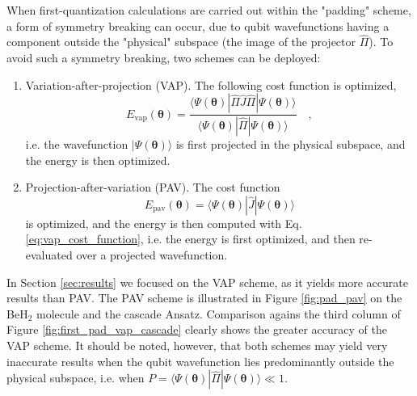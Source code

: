 \documentclass[aps,pra,onecolumn]{revtex4-2}
\newcommand{\bgreek}[1]{{\boldsymbol{#1}}}
\begin{document}
When first-quantization calculations are carried out within the "padding" scheme, a form of symmetry breaking can occur, 
due to qubit wavefunctions having a component outside the "physical" subspace (the image of the projector $\hat \Pi$).
To avoid such a symmetry breaking, two schemes can be deployed:
\begin{enumerate}
\item Variation-after-projection (VAP). The following cost function is optimized,
\begin{equation}
\label{eq:vap_cost_function}
E_{\mathrm{vap}}(\bgreek{\theta}) = \frac{ \langle \Psi(\bgreek{\theta}) | \hat \Pi \hat{J} \hat \Pi | \Psi(\bgreek{\theta}) \rangle }{ \langle \Psi(\bgreek{\theta}) | \hat\Pi | \Psi(\bgreek{\theta}) \rangle } \quad ,
\end{equation}
i.e. the wavefunction $| \Psi(\bgreek{\theta}) \rangle$ is first projected in the physical subspace, and the energy is then optimized.
\item Projection-after-variation (PAV). The cost function
\begin{equation}
E_{\mathrm{pav}}(\bgreek{\theta}) = \langle \Psi(\bgreek{\theta}) | \hat{J} | \Psi(\bgreek{\theta}) \rangle
\end{equation}
is optimized, and the energy is then computed with Eq. \eqref{eq:vap_cost_function},
i.e. the energy is first optimized, and then re-evaluated over a projected wavefunction.
\end{enumerate}
In Section \ref{sec:results} we focused on the VAP scheme, as it yields more accurate results than PAV.
The PAV scheme is illustrated in Figure \ref{fig:pad_pav} on the BeH$_2$ molecule and the cascade Ansatz. 
Comparison agains the third column of Figure \ref{fig:first_pad_vap_cascade} clearly shows the greater accuracy of the VAP scheme.
It should be noted, however, that both schemes may yield very inaccurate results when the qubit wavefunction lies predominantly
outside the physical subspace, i.e. when $P = \langle \Psi(\bgreek{\theta}) | \hat\Pi | \Psi(\bgreek{\theta}) \rangle \ll 1$.
\end{document}
